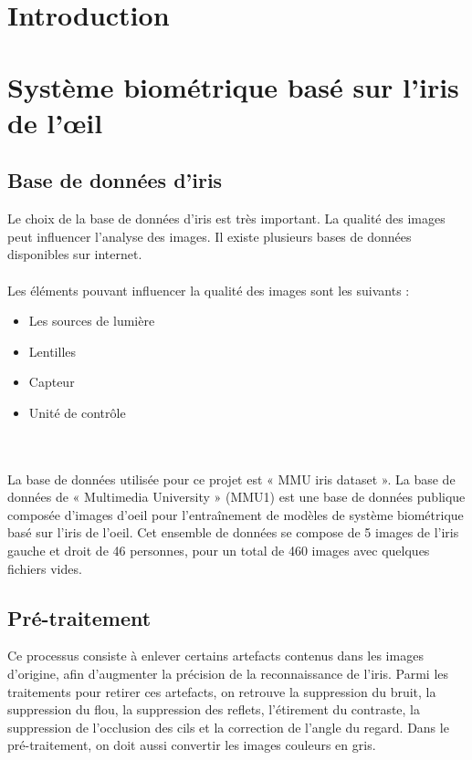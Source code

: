 \documentclass[12pt,twoside,letterpaper]{article}
\begin{document}



\tableofcontents
\newpage

\section{Introduction}
\cite{ref_01}

\section{Système biométrique basé sur l’iris de l’œil}

\subsection{Base de données d’iris}
Le choix de la base de données d’iris est très important. La qualité des images peut influencer l’analyse des images. Il existe plusieurs bases de données disponibles sur internet.
\\~\\
Les éléments pouvant influencer la qualité des images sont les suivants :
\begin{itemize}
    \item Les sources de lumière
    \item Lentilles
    \item Capteur
    \item Unité de contrôle
\end{itemize}
\cite{ref_01}\cite{ref_06}
\ \\~\\
La base de données utilisée pour ce projet est « MMU iris dataset ». La base de données de « Multimedia University » (MMU1) est une base de données publique composée d'images d'oeil pour l'entraînement de modèles de système biométrique basé sur l'iris de l'oeil. Cet ensemble de données se compose de 5 images de l'iris gauche et droit de 46 personnes, pour un total de 460 images avec quelques fichiers vides.\cite{ref_05}

\subsection{Pré-traitement}
Ce processus consiste à enlever certains artefacts contenus dans les images d’origine, afin d’augmenter la précision de la reconnaissance de l’iris. Parmi les traitements pour retirer ces artefacts, on retrouve la suppression du bruit, la suppression du flou, la suppression des reflets, l’étirement du contraste, la suppression de l’occlusion des cils et la correction de l'angle du regard. Dans le pré-traitement, on doit aussi convertir les images couleurs en gris.\cite{ref_01}\cite{ref_06}
\end{document}
